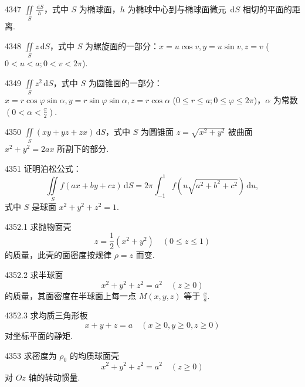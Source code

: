 \begin{prob}[M]{4347}
$\iint\limits_S \frac{\,\mathrm{d}S}{h}$，式中 $S$ 为椭球面，$h$ 为椭球中心到与椭球面微元 $\,\mathrm{d}S$ 相切的平面的距离.
\end{prob}

\begin{prob}[M]{4348}
$\iint\limits_S z\,\mathrm{d}S$，式中 $S$ 为螺旋面的一部分：$x = u\cos v, y = u\sin v, z = v$ ($0 < u < a; 0 < v < 2\pi$).
\end{prob}

\begin{prob}[M]{4349}
$\iint\limits_S z^2\,\mathrm{d}S$，式中 $S$ 为圆锥面的一部分：$x = r\cos\varphi\sin\alpha, y = r\sin\varphi\sin\alpha, z = r\cos\alpha$ ($0 \leqslant r \leqslant a; 0 \leqslant \varphi \leqslant 2\pi$)，$\alpha$ 为常数 $\left(0 < \alpha < \frac{\pi}{2}\right)$.
\end{prob}

\begin{prob}[M]{4350}
$\iint\limits_S (xy + yz + zx)\,\mathrm{d}S$，式中 $S$ 为圆锥面 $z = \sqrt{x^2 + y^2}$ 被曲面 $x^2 + y^2 = 2ax$ 所割下的部分.
\end{prob}

\begin{prob}[M]{4351}
证明泊松公式：
\[
\iint\limits_S f(ax + by + cz)\,\mathrm{d}S = 2\pi \int_{-1}^{1} f(u\sqrt{a^2 + b^2 + c^2})\,\mathrm{d}u,
\]
式中 $S$ 是球面 $x^2 + y^2 + z^2 = 1$.
\end{prob}

\begin{prob}[M]{4352.1}
求抛物面壳
\[
z = \frac{1}{2}(x^2 + y^2) \quad (0 \leqslant z \leqslant 1)
\]
的质量，此壳的面密度按规律 $\rho = z$ 而变.
\end{prob}

\begin{prob}[M]{4352.2}
求半球面
\[
x^2 + y^2 + z^2 = a^2 \quad (z \geqslant 0)
\]
的质量，其面密度在半球面上每一点 $M(x,y,z)$ 等于 $\frac{x}{a}$.
\end{prob}

\begin{prob}[M]{4352.3}
求均质三角形板
\[
x + y + z = a \quad (x \geqslant 0, y \geqslant 0, z \geqslant 0)
\]
对坐标平面的静矩.
\end{prob}

\begin{prob}[M]{4353}
求密度为 $\rho_0$ 的均质球面壳
\[
x^2 + y^2 + z^2 = a^2 \quad (z \geqslant 0)
\]
对 $Oz$ 轴的转动惯量.
\end{prob}

